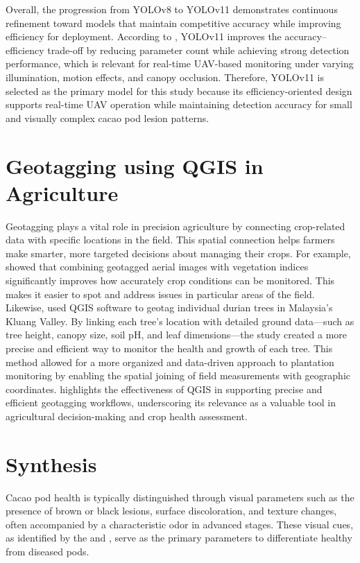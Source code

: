 Overall, the progression from YOLOv8 to YOLOv11 demonstrates continuous refinement toward models that maintain competitive accuracy while improving efficiency for deployment. According to \cite{UltralyticsBlog2025}, YOLOv11 improves the accuracy--efficiency trade-off by reducing parameter count while achieving strong detection performance, which is relevant for real-time UAV-based monitoring under varying illumination, motion effects, and canopy occlusion. Therefore, YOLOv11 is selected as the primary model for this study because its efficiency-oriented design supports real-time UAV operation while maintaining detection accuracy for small and visually complex cacao pod lesion patterns.

\section{Geotagging using QGIS in Agriculture}
Geotagging plays a vital role in precision agriculture by connecting crop-related data with specific locations in the field. This spatial connection helps farmers make smarter, more targeted decisions about managing their crops. For example, \cite{Mohidem2021} showed that combining geotagged aerial images with vegetation indices significantly improves how accurately crop conditions can be monitored. This makes it easier to spot and address issues in particular areas of the field. Likewise, \cite{Rahman2021} used QGIS software to geotag individual durian trees in Malaysia’s Kluang Valley. By linking each tree’s location with detailed ground data—such as tree height, canopy size, soil pH, and leaf dimensions—the study created a more precise and efficient way to monitor the health and growth of each tree. This method allowed for a more organized and data-driven approach to plantation monitoring by enabling the spatial joining of field measurements with geographic coordinates. \cite{Rahman2021} highlights the effectiveness of QGIS in supporting precise and efficient geotagging workflows, underscoring its relevance as a valuable tool in agricultural decision-making and crop health assessment.

\section{Synthesis}

Cacao pod health is typically distinguished through visual parameters such as the presence of brown or black lesions, surface discoloration, and texture changes, often accompanied by a characteristic odor in advanced stages. These visual cues, as identified by the \cite{PhilCacaoRoadmap2021} and \cite{PCAF2021}, serve as the primary parameters to differentiate healthy from diseased pods.


